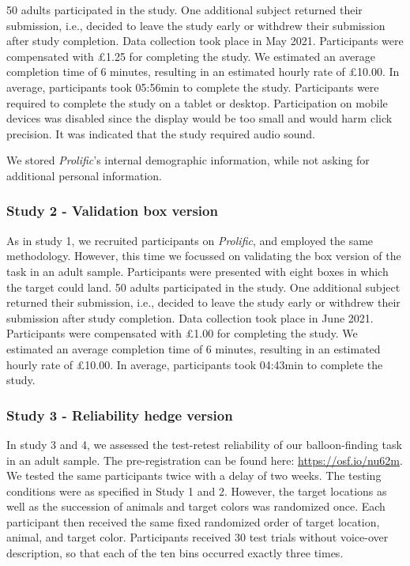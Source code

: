 \documentclass[
  man,floatsintext]{apa6}
\begin{document}
50 adults participated in the study. One additional subject returned their submission, i.e., decided to leave the study early or withdrew their submission after study completion. Data collection took place in May 2021.
Participants were compensated with £1.25 for completing the study. We estimated an average completion time of 6 minutes, resulting in an estimated hourly rate of £10.00. In average, participants took 05:56min to complete the study.
Participants were required to complete the study on a tablet or desktop. Participation on mobile devices was disabled since the display would be too small and would harm click precision. It was indicated that the study required audio sound.

We stored \emph{Prolific}'s internal demographic information, while not asking for additional personal information.

\hypertarget{study-2---validation-box-version}{%
\subsubsection{Study 2 - Validation box version}\label{study-2---validation-box-version}}

As in study 1, we recruited participants on \emph{Prolific}, and employed the same methodology. However, this time we focussed on validating the box version of the task in an adult sample. Participants were presented with eight boxes in which the target could land.
50 adults participated in the study. One additional subject returned their submission, i.e., decided to leave the study early or withdrew their submission after study completion. Data collection took place in June 2021.
Participants were compensated with £1.00 for completing the study. We estimated an average completion time of 6 minutes, resulting in an estimated hourly rate of £10.00. In average, participants took 04:43min to complete the study.

\hypertarget{study-3---reliability-hedge-version}{%
\subsubsection{Study 3 - Reliability hedge version}\label{study-3---reliability-hedge-version}}

In study 3 and 4, we assessed the test-retest reliability of our balloon-finding task in an adult sample. The pre-registration can be found here: \url{https://osf.io/nu62m}. We tested the same participants twice with a delay of two weeks. The testing conditions were as specified in Study 1 and 2. However, the target locations as well as the succession of animals and target colors was randomized once. Each participant then received the same fixed randomized order of target location, animal, and target color. Participants received 30 test trials without voice-over description, so that each of the ten bins occurred exactly three times.
\end{document}

